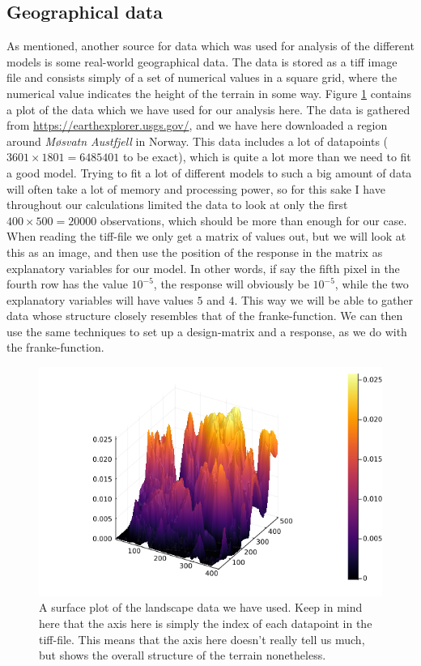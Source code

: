 \documentclass{article}
\begin{document}
\subsection{Geographical data}
As mentioned, another source for data which was used for analysis of the
different models is some real-world geographical data. The data is stored as a
tiff image file and consists simply of a set of numerical values in a square
grid, where the numerical value indicates the height of the terrain in some way.
Figure \ref{landscape-plot} contains a plot of the data which we have used for
our analysis here.  The data is gathered from
\url{https://earthexplorer.usgs.gov/}, and we have here downloaded a region
around \textit{Møsvatn Austfjell} in Norway. This data includes a lot of
datapoints ($3601\times 1801 = 6485401$ to be exact), which is quite a lot more
than we need to fit a good model. Trying to fit a lot of different models to
such a big amount of data will often take a lot of memory and processing power,
so for this sake I have throughout our calculations limited the data to look at
only the first $400\times 500 = 20000$ observations, which should be more than
enough for our case. When reading the tiff-file we only get a matrix of values
out, but we will look at this as an image, and then use the position of the
response in the matrix as explanatory variables for our model. In other words,
if say the fifth pixel in the fourth row has the value $10^{-5}$, the response
will obviously be $10^{-5}$, while the two explanatory variables will have
values $5$ and $4$.  This way we will be able to gather data whose structure
closely resembles that of the franke-function. We can then use the same
techniques to set up a design-matrix and a response, as we do with the
franke-function.

\begin{figure}
    \centerline{\includegraphics[scale=0.5]{landscapesurface}}
    \caption{A surface plot of the landscape data we have used. Keep in mind
        here that the axis here is simply the index of each datapoint in the
        tiff-file. This means that the axis here doesn't really tell us much, but
        shows the overall structure of the terrain nonetheless.}
    \label{landscape-plot}
\end{figure}
\end{document}
